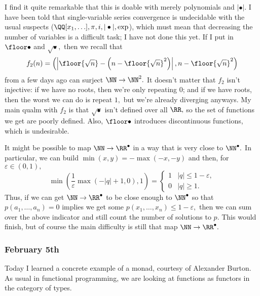I find it quite remarkable that this is doable with merely polynomials and $|\bullet|.$ I have been told that single-variable series convergence is undecidable with the usual suspects ($\QQ[x_1,\ldots],\pi,i,|\bullet|,\exp$), which must mean that decreasing the number of variables is a difficult task; I have not done this yet. If I put in $\floor\bullet$ and $\sqrt\bullet,$ then we recall that
\[f_2(n)=\left(\left|\floor{\sqrt n}-\left(n-\floor{\sqrt n}^2\right)\right|,n-\floor{\sqrt n}^2\right)\]
from a few days ago can surject $\NN\to\NN^2.$ It doesn't matter that $f_2$ isn't injective: if we have no roots, then we're only repeating $0$; and if we have roots, then the worst we can do is repeat $1,$ but we're already diverging anyways. My main qualm with $f_2$ is that $\sqrt\bullet$ isn't defined over all $\RR,$ so the set of functions we get are poorly defined. Also, $\floor\bullet$ introduces discontinuous functions, which is undesirable.

It might be possible to map $\NN\to\RR^\bullet$ in a way that is very close to $\NN^\bullet.$ In particular, we can build $\min(x,y)=-\max(-x,-y)$ and then, for $\varepsilon\in(0,1),$
\[\min\left(\frac1\varepsilon\max(-|q|+1,0),1\right)=\begin{cases}
    1 & |q|\le1-\varepsilon, \\
    0 & |q|\ge1.
\end{cases}\]
Thus, if we can get $\NN\to\RR^\bullet$ to be close enough to $\NN^\bullet$ so that $p(a_1,\ldots,a_n)=0$ implies we get some $p(x_1,\ldots,x_n)\le1-\varepsilon,$ then we can sum over the above indicator and still count the number of solutions to $p.$ This would finish, but of course the main difficulty is still that map $\NN\to\RR^\bullet.$

\subsubsection{February 5th}
Today I learned a concrete example of a monad, courtesy of Alexander Burton. As usual in functional programming, we are looking at functions as functors in the category of types. 

